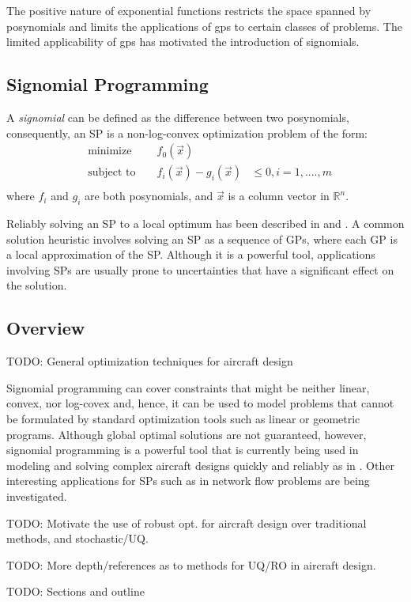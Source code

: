 The positive nature of exponential functions restricts the space spanned by posynomials and limits the applications of \gls{gp}s to certain classes of problems. The limited applicability of \gls{gp}s has motivated the introduction of signomials.

\subsection{Signomial Programming}
A {\em signomial} can be defined as the difference between two posynomials, consequently, an SP is a non-log-convex optimization problem of the form:
\begin{equation}
\begin{aligned}
&\text{minimize } && f_{0}(\vec{x}) \\
&\text{subject to } && f_{i}(\vec{x}) - g_{i}(\vec{x})& \leq 0, i = 1, ...., m \\
\end{aligned}
\end{equation} 
where $f_{i}$ and $g_{i}$ are both posynomials, and $\vec{x}$ is a column vector in $\mathbb{R}^n$. 

Reliably solving an SP to a local optimum has been described in \cite{GP_tutorial} and \cite{lipp_boyd_2015}. A common solution heuristic involves solving an SP as a sequence of GPs, where each GP is a local approximation of the SP. Although it is a powerful tool, applications involving SPs are usually prone to uncertainties that have a significant effect on the solution.

\subsection{Overview}

TODO: General optimization techniques for aircraft design

Signomial programming can cover constraints that might be neither linear, convex, nor log-covex and, hence, it can be used to model problems that cannot be formulated by standard optimization tools such as linear or geometric programs. Although global optimal solutions are not guaranteed, however, signomial programming is a powerful tool that is currently being used in modeling and solving complex aircraft designs quickly and reliably as in \cite{york_hoburg_drela_2018} \cite{kirschen_burnell_hoburg_2016} \cite{kirschen_york_ozturk_hoburg_2018}. Other interesting applications for SPs such as in network flow problems are being investigated.

TODO: Motivate the use of robust opt. for aircraft design over traditional methods, and stochastic/UQ.

TODO: More depth/references as to methods for UQ/RO in aircraft design.

TODO: Sections and outline
